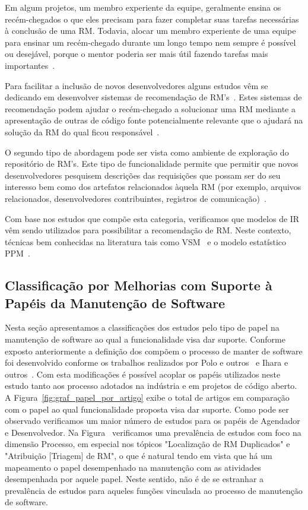 Em algum projetos, um membro experiente da equipe, geralmente ensina os
recém-chegados o que eles precisam para fazer completar suas tarefas necessárias
à conclusão de uma RM. Todavia, alocar um membro experiente de uma equipe para
ensinar um recém-chegado durante um longo tempo nem sempre é possível ou
desejável, porque o mentor poderia ser mais útil fazendo tarefas mais
importantes~\cite{malheiros2012source}.

Para facilitar a inclusão de novos desenvolvedores alguns estudos vêm se
dedicando em desenvolver sistemas de recomendação de
RM's~\cite{malheiros2012source, Wang2011bug}. Estes sistemas de recomendação
podem ajudar o recém-chegado a solucionar uma RM mediante a apresentação de
outras de código fonte potencialmente relevante que o ajudará na solução da RM
do qual ficou responsável~\cite{malheiros2012source}.

O segundo tipo de abordagem pode ser vista como ambiente de exploração do
repositório de RM's.  Este tipo de funcionalidade permite que permitir que novos
desenvolvedores pesquisem descrições das requisições que possam ser do seu
interesso bem como dos artefatos relacionados àquela RM (por exemplo, arquivos
relacionados, desenvolvedores contribuintes, registros de
comunicação)~\cite{Wang2011bug}.

Com base nos estudos que compõe esta categoria, verificamos que modelos de IR
vêm sendo utilizados para possibilitar a recomendação de RM. Neste contexto,
técnicas bem conhecidas na literatura tais como VSM~\cite{Wang2011bug} e o
modelo estatístico PPM~\cite{malheiros2012source}.

\subsection{Classificação por Melhorias com Suporte à Papéis da Manutenção de
	Software}
\label{sub:extensões_com_suporte_a_papeis}
Nesta seção apresentamos a classificações dos estudos pelo tipo de papel na
manutenção de software ao qual a funcionalidade visa dar suporte. Conforme
exposto anteriormente a definição dos compõem o processo de manter de software
foi desenvolvido conforme os trabalhos realizados por Polo e
outros~\cite{Polo1999} e Ihara e outros~\cite{Ihara:2009:AMI:1595808.1595833}\@.
Com esta modificações é possível acoplar os papéis utilizados neste estudo tanto
aos processo adotados na indústria e em projetos de código aberto. A
Figura~\ref{fig:graf_papel_por_artigo} exibe o total de artigos em comparação
com o papel ao qual funcionalidade proposta visa dar suporte. Como pode ser
observado verificamos um maior número de estudos para os papéis de Agendador e
Desenvolvedor. Na Figura~\cite{fig:grafico_topico_por_artigo} verificamos uma
prevalência de estudos com foco na dimensão Processo, em especial nos tópicos
"Localização de RM Duplicados" e "Atribuição [Triagem] de RM", o que  é natural
tendo em vista que há um mapeamento o papel desempenhado na manutenção com as
atividades desempenhada por aquele papel. Neste sentido, não é de se estranhar a
prevalência de estudos para aqueles funções vinculada ao processo de manutenção
de software.

